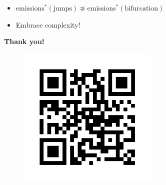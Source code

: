 \documentclass[pdf]{beamer}
\begin{document}
\begin{frame}
    \begin{itemize} \setlength{\itemsep}{10pt}
        \item $\text{emissions}^*(\text{jumps}) \not\approx \text{emissions}^*(\text{bifurcation})$
        \pause \item Embrace complexity!
    \end{itemize}
\end{frame}

\begin{frame}
    \textbf{Thank you!}
    \begin{figure}
        \centering
        \includegraphics[width = 0.6\textwidth]{qr.png}
    \end{figure}
\end{frame}
\end{document}
